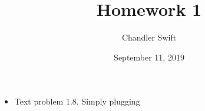 \documentclass{article}
\title{Homework 1}
\author{Chandler Swift}
\date{September 11, 2019}
\begin{document}
\maketitle
\begin{itemize}
  \item Text problem 1.8. Simply plugging 
\end{itemize}
\end{document}
